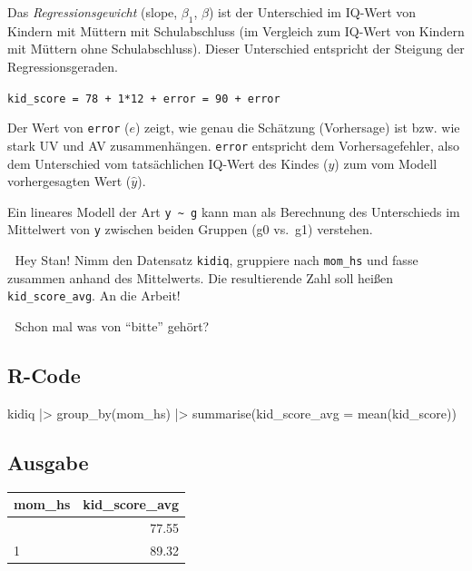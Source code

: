\documentclass[
  ngerman,
  letterpaper,
  twoside,
  open=any]{scrbook}
\newenvironment{Shaded}{\begin{snugshade}}{\end{snugshade}}
\newcommand{\AttributeTok}[1]{\textcolor[rgb]{0.40,0.45,0.13}{#1}}
\newcommand{\FunctionTok}[1]{\textcolor[rgb]{0.28,0.35,0.67}{#1}}
\newcommand{\NormalTok}[1]{\textcolor[rgb]{0.00,0.23,0.31}{#1}}
\newcommand{\SpecialCharTok}[1]{\textcolor[rgb]{0.37,0.37,0.37}{#1}}
\newcounter{none} %
\theoremstyle{definition}
\theoremstyle{plain}
\theoremstyle{definition}
\theoremstyle{definition}
\theoremstyle{definition}
\theoremstyle{definition}
\theoremstyle{remark}
\begin{document}
Das \emph{Regressionsgewicht} (slope, \(\beta_1\), \(\beta\)) ist der
Unterschied im IQ-Wert von Kindern mit Müttern mit Schulabschluss (im
Vergleich zum IQ-Wert von Kindern mit Müttern ohne Schulabschluss).
Dieser Unterschied entspricht der Steigung der Regressionsgeraden.

\texttt{kid\_score\ =\ 78\ +\ 1*12\ +\ error\ =\ 90\ +\ error}

Der Wert von \texttt{error} (\(e\)) zeigt, wie genau die Schätzung
(Vorhersage) ist bzw. wie stark UV und AV zusammenhängen. \texttt{error}
entspricht dem Vorhersagefehler, also dem Unterschied vom tatsächlichen
IQ-Wert des Kindes (\(y\)) zum vom Modell vorhergesagten Wert
(\(\hat{y}\)).

Ein lineares Modell der Art \texttt{y\ \textasciitilde{}\ g} kann man
als Berechnung des Unterschieds im Mittelwert von \texttt{y} zwischen
beiden Gruppen (g0 vs.~g1) verstehen.

\begin{displayquote}
👨 Hey Stan! Nimm den Datensatz \texttt{kidiq}, gruppiere nach
\texttt{mom\_hs} und fasse zusammen anhand des Mittelwerts. Die
resultierende Zahl soll heißen \texttt{kid\_score\_avg}. An die Arbeit!
\end{displayquote}

\begin{displayquote}
🤖 Schon mal was von \enquote{bitte} gehört?
\end{displayquote}

\subsection{R-Code}

\begin{Shaded}
\begin{Highlighting}[]
\NormalTok{kidiq }\SpecialCharTok{|\textgreater{}} 
  \FunctionTok{group\_by}\NormalTok{(mom\_hs) }\SpecialCharTok{|\textgreater{}} 
  \FunctionTok{summarise}\NormalTok{(}\AttributeTok{kid\_score\_avg =} 
              \FunctionTok{mean}\NormalTok{(kid\_score))}
\end{Highlighting}
\end{Shaded}

\subsection{Ausgabe}

{\def\LTcaptype{none} %
\begin{longtable}[]{@{}lr@{}}
\toprule\noalign{}
mom\_hs & kid\_score\_avg \\
\midrule\noalign{}
\endhead
\bottomrule\noalign{}
\endlastfoot
0 & 77.55 \\
1 & 89.32 \\
\end{longtable}
}
\end{document}
